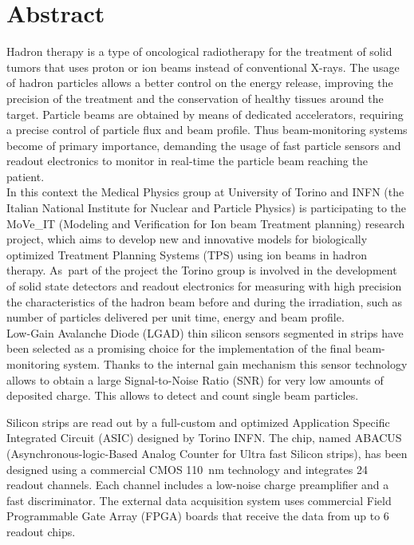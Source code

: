 
\chapter*{Abstract}
\thispagestyle{plain}
Hadron therapy is a type of oncological radiotherapy for the treatment of solid tumors that uses proton or
ion beams instead of conventional X-rays. The usage of hadron particles allows a better control on the energy release,
improving the precision of the treatment and the conservation of healthy tissues around the target.
Particle beams are obtained by means of dedicated accelerators, requiring a precise control of particle flux and beam profile.
Thus beam-monitoring systems become of primary importance, demanding the usage of fast particle sensors and readout electronics to monitor
in real-time the particle beam reaching the patient.\\

In this context the Medical Physics group at University of Torino and INFN (the Italian National Institute for
Nuclear and Particle Physics) is participating to the MoVe\_IT (Modeling and Verification for Ion beam Treatment planning) research project, which aims to develop new and
innovative models for biologically optimized Treatment Planning Systems (TPS) using ion beams in hadron therapy.
As~part of the project the Torino group is involved in the development of solid state detectors and readout electronics for measuring with high precision
the characteristics of the hadron beam before and during the irradiation, such as number of particles delivered per unit time, energy and beam profile.\\

Low-Gain Avalanche Diode (LGAD) thin silicon sensors segmented in strips have been selected as a promising choice for the implementation
of the final beam-monitoring system. Thanks to the internal gain mechanism this sensor technology allows to obtain a large
Signal-to-Noise Ratio (SNR) for very low amounts of deposited charge. This allows to detect and count single beam particles.

\noindent Silicon strips are read out by a full-custom and optimized Application Specific Integrated Circuit (ASIC) designed by Torino INFN.
The chip, named ABACUS (Asynchronous-logic-Based Analog Counter for Ultra fast Silicon strips), has been 
designed using a commercial CMOS 110~nm technology and integrates 24 readout channels. Each channel includes a low-noise charge preamplifier 
and a fast discriminator. The external data acquisition system uses commercial Field Programmable Gate Array (FPGA) boards that receive
the data from up to 6 readout chips.\\%

